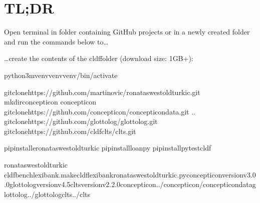 \documentclass[letterpaper,10pt,english]{sphinxmanual}
\begin{document}
{{{{\begin{itemize}
\end{itemize}

\sphinxstepscope


\chapter{TL;DR}
\label{\detokenize{TL;DR:id1}}\label{\detokenize{TL;DR::doc}}\label{\detokenize{TL;DR:module-ronataswestoldturkiccommands.__init__}}
\sphinxAtStartPar
Open terminal in folder containing GitHub projects or
in a newly created folder and run the commands below to…

\sphinxAtStartPar
…create the contents of the cldf\sphinxhyphen{}folder (download size: 1GB+):

\begin{sphinxVerbatim}[commandchars=\\\{\}]
python3\PYGZhy{}mvenvvenvvenv/bin/activate

gitclonehttps://github.com/martino\PYGZhy{}vic/ronataswestoldturkic.git
mkdirconcepticon
concepticon
gitclonehttps://github.com/concepticon/concepticon\PYGZhy{}data.git
..
gitclonehttps://github.com/glottolog/glottolog.git
gitclonehttps://github.com/cldf\PYGZhy{}clts/clts.git

pipinstall\PYGZhy{}eronataswestoldturkic
pipinstallloanpy
pipinstallpytest\PYGZhy{}cldf

ronataswestoldturkic
cldfbenchlexibank.makecldflexibank\PYGZus{}ronataswestoldturkic.py\PYGZhy{}\PYGZhy{}concepticon\PYGZhy{}versionv3.0.0\PYGZhy{}\PYGZhy{}glottolog\PYGZhy{}versionv4.5\PYGZhy{}\PYGZhy{}clts\PYGZhy{}versionv2.2.0\PYGZhy{}\PYGZhy{}concepticon../concepticon/concepticon\PYGZhy{}data\PYGZhy{}\PYGZhy{}glottolog../glottolog\PYGZhy{}\PYGZhy{}clts../clts


\end{sphinxVerbatim}}}}}
\end{document}
